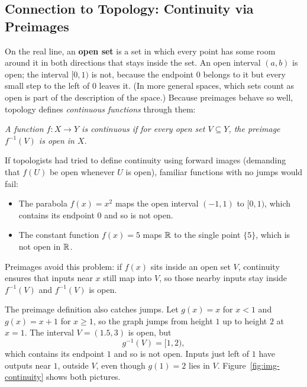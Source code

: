 \subsection{Connection to Topology: Continuity via Preimages}

On the real line, an \textbf{open set} is a set in which every point has some room around it in both directions that stays inside the set. An open interval $(a, b)$ is open; the interval $[0, 1)$ is not, because the endpoint $0$ belongs to it but every small step to the left of $0$ leaves it. (In more general spaces, which sets count as open is part of the description of the space.) Because preimages behave so well, topology defines \emph{continuous functions} through them:
\begin{center}
\emph{A function $f: X \to Y$ is continuous if for every open set $V \subseteq Y$, the preimage $f^{-1}(V)$ is open in $X$.}
\end{center}

If topologists had tried to define continuity using forward images (demanding that $f(U)$ be open whenever $U$ is open), familiar functions with no jumps would fail:
\begin{itemize}
\item The parabola $f(x) = x^2$ maps the open interval $(-1, 1)$ to $[0, 1)$, which contains its endpoint $0$ and so is not open.
\item The constant function $f(x) = 5$ maps $\mathbb{R}$ to the single point $\{5\}$, which is not open in $\mathbb{R}$.
\end{itemize}
Preimages avoid this problem: if $f(x)$ sits inside an open set $V$, continuity ensures that inputs near $x$ still map into $V$, so those nearby inputs stay inside $f^{-1}(V)$ and $f^{-1}(V)$ is open.

The preimage definition also catches jumps. Let $g(x) = x$ for $x < 1$ and $g(x) = x + 1$ for $x \ge 1$, so the graph jumps from height $1$ up to height $2$ at $x = 1$. The interval $V = (1.5, 3)$ is open, but
\[
g^{-1}(V) = [1, 2),
\]
which contains its endpoint $1$ and so is not open. Inputs just left of $1$ have outputs near $1$, outside $V$, even though $g(1) = 2$ lies in $V$. Figure~\ref{fig:img-continuity} shows both pictures.

